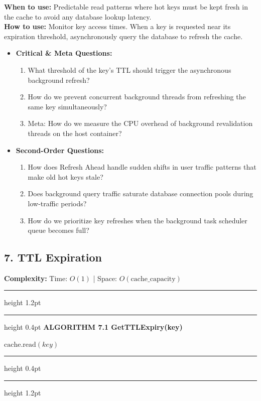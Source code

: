 \documentclass[11pt,a4paper]{article}
\newenvironment{textbookalgo}[2]{%
  \par\addvspace{1.2em}\noindent
  \hrule height 1.2pt
  \vspace{1.5pt}
  \hrule height 0.4pt
  \vspace{5pt}
  {\noindent\large\bfseries\sffamily ALGORITHM #1 \quad #2}
  \par\vspace{5pt}
  \RestyleAlgo{plain}
}{%
  \par\vspace{4pt}
  \hrule height 0.4pt
  \vspace{1.5pt}
  \hrule height 1.2pt
  \par\addvspace{1.2em}
}
\theoremstyle{definition}
\begin{document}
\noindent
\textbf{When to use:} Predictable read patterns where hot keys must be kept fresh in the cache to avoid any database lookup latency.\\
\textbf{How to use:} Monitor key access times. When a key is requested near its expiration threshold, asynchronously query the database to refresh the cache.
\begin{itemize}[leftmargin=*]
  \item[] \textbf{Critical \& Meta Questions:}
  \begin{enumerate}
  \item What threshold of the key's TTL should trigger the asynchronous background refresh?
  \item How do we prevent concurrent background threads from refreshing the same key simultaneously?
  \item Meta: How do we measure the CPU overhead of background revalidation threads on the host container?
  \end{enumerate}
  \item[] \textbf{Second-Order Questions:}
  \begin{enumerate}
  \item How does Refresh Ahead handle sudden shifts in user traffic patterns that make old hot keys stale?
  \item Does background query traffic saturate database connection pools during low-traffic periods?
  \item How do we prioritize key refreshes when the background task scheduler queue becomes full?
  \end{enumerate}
\end{itemize}
\medskip

\clearpage
\subsection{7. TTL Expiration}

\noindent
\textbf{Complexity:} Time: $O(1)$ | Space: $O(\text{cache\_capacity})$
\smallskip

\begin{textbookalgo}{7.1}{GetTTLExpiry(key)}
\begin{algorithm}[H]
\Return $\text{cache.read}(key)$\;
\end{algorithm}
\end{textbookalgo}
\end{document}
